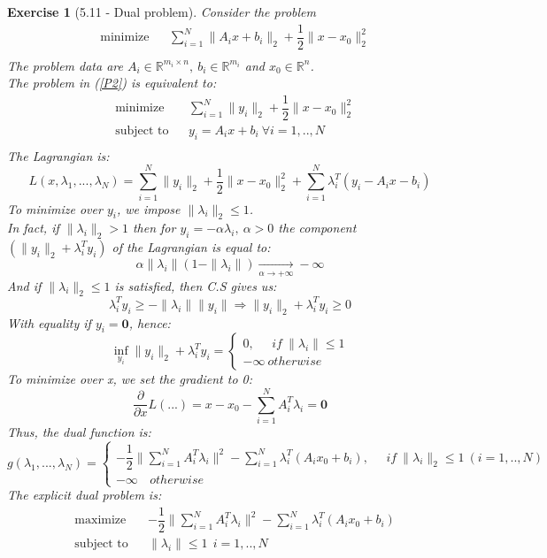 \documentclass[11pt]{article}
\theoremstyle{exo}
\newtheorem*{exercise}{Exercise}
\newcommand{\R}{\mathbb{R}}
\newcommand{\1}{\mathbf{1}}
\newcommand{\0}{\mathbf{0}}
\begin{document}
\begin{exercise}[5.11 - Dual problem]
Consider the problem
\begin{equation}
\label{P2}
\begin{aligned}
& {\text{minimize}} & & \sum\limits_{i=1}^N\|A_ix+b_i\|_2+\dfrac{1}{2}\|x-x_0\|_2^2 \\
\end{aligned}
\end{equation}
The problem data are $A_i\in\R^{m_i\times n},\:b_i\in\R^{m_i}$ and $x_0\in\R^n$. \\
The problem in (\ref{P2}) is equivalent to:
\begin{equation*}
\begin{aligned}
& {\text{minimize}} & & \sum\limits_{i=1}^N\|y_i\|_2+\dfrac{1}{2}\|x-x_0\|_2^2 \\
& \text{subject to} & & y_i=A_ix+b_i\:\forall i=1,..,N\\
\end{aligned}
\end{equation*}
The Lagrangian is:
\[L(x,\lambda_1,...,\lambda_N)=\sum\limits_{i=1}^N\|y_i\|_2+\dfrac{1}{2}\|x-x_0\|_2^2+\sum_{i=1}^N\lambda_i^T(y_i-A_ix-b_i)\]
To minimize over $y_i$, we impose $\|\lambda_i\|_2\leq 1$.\\
In fact, if $\|\lambda_i\|_2>1$ then for $y_i=-\alpha \lambda_i,\:\alpha>0$ the component $(\|y_i\|_2+\lambda_i^Ty_i)$ of the Lagrangian is equal to:
\[\alpha \|\lambda_i\|(1-\|\lambda_i\|)\xrightarrow[\alpha\to+\infty]{}-\infty\]
And if $\|\lambda_i\|_2\leq 1$ is satisfied, then C.S gives us:
\[\lambda_i^Ty_i\geq -\|\lambda_i\|\|y_i\|\Rightarrow \|y_i\|_2+\lambda_i^Ty_i\geq 0\]
With equality if $y_i=\0$, hence:
\[\inf_{y_i}\|y_i\|_2+\lambda_i^Ty_i=\begin{cases}0,\phantom{abc}if\:\|\lambda_i\|\leq 1\\-\infty\:otherwise\end{cases} \]
To minimize over x, we set the gradient to 0:
\[\frac{\partial}{\partial x}L(...)=x-x_0-\sum_{i=1}^NA_i^T\lambda_i=\0\]
Thus, the dual function is:
\[g(\lambda_1,...,\lambda_N)=\begin{cases}-\dfrac{1}{2}\|\sum_{i=1}^NA_i^T\lambda_i\|^2-\sum_{i=1}^N\lambda_i^T(A_ix_0+b_i),\phantom{abc}if\:\|\lambda_i\|_2\leq 1\:(i=1,..,N)\\-\infty\phantom{ab}otherwise \end{cases}\]
The explicit dual problem is:
\begin{equation*}
\begin{aligned}
& {\text{maximize}} & &-\dfrac{1}{2}\|\sum_{i=1}^NA_i^T\lambda_i\|^2-\sum_{i=1}^N\lambda_i^T(A_ix_0+b_i) \\
& \text{subject to} & & \|\lambda_i\|\leq1\:\ i=1,..,N\\
\end{aligned}
\end{equation*}
\end{exercise}
\end{document}
